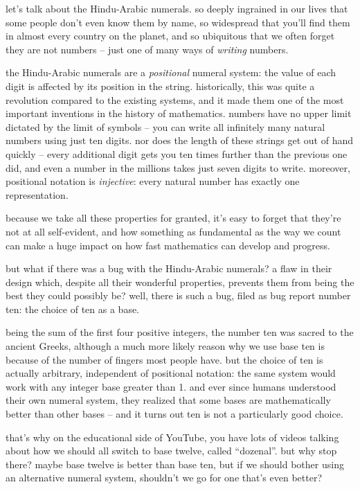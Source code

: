 \documentclass[../best.tex]{subfiles}
\begin{document}

let's talk about the Hindu-Arabic numerals. so deeply ingrained in our lives that some people don't even know them by name,\myfootnote[i]{} so widespread that you'll find them in almost every country on the planet, and so ubiquitous that we often forget they are not numbers -- just one of many ways of \emph{writing} numbers.

the Hindu-Arabic numerals are a {\it positional} numeral system: the value of each digit is affected by its position in the string. historically, this was quite a revolution compared to the existing systems, and it made them one of the most important inventions in the history of mathematics. numbers have no upper limit dictated by the limit of symbols -- you can write all infinitely many natural numbers using just ten digits. nor does the length of these strings get out of hand quickly -- every additional digit gets you ten times further than the previous one did, and even a number in the millions takes just seven digits to write. moreover, positional notation is {\it injective}: every natural number has exactly one representation.

because we take all these properties for granted, it's easy to forget that they're not at all self-evident, and how something as fundamental as the way we count can make a huge impact on how fast mathematics can develop and progress.

but what if there was a bug with the Hindu-Arabic numerals? a flaw in their design which, despite all their wonderful properties, prevents them from being the best they could possibly be? well, there is such a bug, filed as bug report number ten: the choice of ten as a base.

being the sum of the first four positive integers, the number ten was sacred to the ancient Greeks,\myfootnote[i]{} although a much more likely reason why we use base ten is because of the number of fingers most people have. but the choice of ten is actually arbitrary, independent of positional notation: the same system would work with any integer base greater than 1. and ever since humans understood their own numeral system, they realized that some bases are mathematically better than other bases -- and it turns out ten is not a particularly good choice.

that's why on the educational side of YouTube, you have lots of videos talking about how we should all switch to base twelve, called ``dozenal''. but why stop there? maybe base twelve is better than base ten, but if we should bother using an alternative numeral system, shouldn't we go for one that's even better?
\end{document}
